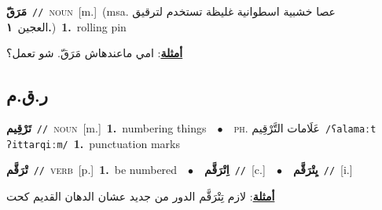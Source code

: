 \documentclass[10pt,a4paper,twoside]{article} %
\begin{document}
\begin{multicols}{2}
{\setlength\topsep{0pt}\textbf{\foreignlanguage{arabic}{مَرَقّ}}\ {\color{gray}\texttt{//}\color{black}}\ \textsc{noun}\ [m.]\ \color{gray}(msa. \foreignlanguage{arabic}{عصا خشبية اسطوانية غليظة تستخدم لترقيق العجين}~\foreignlanguage{arabic}{\textbf{١.}})\color{black}\ \textbf{1.}~rolling pin\  \begin{flushright}\color{gray}\foreignlanguage{arabic}{\textbf{\underline{\foreignlanguage{arabic}{أمثلة}}}: امي ماعندهاش مَرَقّ. شو تعمل؟}\end{flushright}\color{black}} \vspace{2mm}

\vspace{-3mm}
\subsection*{\color{blue}\foreignlanguage{arabic}{ر.ق.م}\color{blue}{}} 

{\setlength\topsep{0pt}\textbf{\foreignlanguage{arabic}{تَرْقِيم}}\ {\color{gray}\texttt{//}\color{black}}\ \textsc{noun}\ [m.]\ \textbf{1.}~numbering things\ \ $\bullet$\ \ \textsc{ph.} \color{gray} \foreignlanguage{arabic}{عَلَامات التَّرْقِيم}\color{black}\ {\color{gray}\texttt{/{\sffamily ʕalamaːt ʔittarqiːm}/}\color{black}}\ \textbf{1.}~punctuation marks\ } \vspace{2mm}

{\setlength\topsep{0pt}\textbf{\foreignlanguage{arabic}{تْرَقَّم}}\ {\color{gray}\texttt{//}\color{black}}\ \textsc{verb}\ [p.]\ \textbf{1.}~be numbered\ \ $\bullet$\ \ \setlength\topsep{0pt}\textbf{\foreignlanguage{arabic}{اِتْرَقَّم}}\ {\color{gray}\texttt{//}\color{black}}\ [c.]\ \ $\bullet$\ \ \setlength\topsep{0pt}\textbf{\foreignlanguage{arabic}{يِتْرَقَّم}}\ {\color{gray}\texttt{//}\color{black}}\ [i.]\  \begin{flushright}\color{gray}\foreignlanguage{arabic}{\textbf{\underline{\foreignlanguage{arabic}{أمثلة}}}: لازم تِتْرَقَّم الدور من جديد عشان الدهان القديم كحت}\end{flushright}\color{black}} \vspace{2mm}


\end{multicols}
\end{document}
